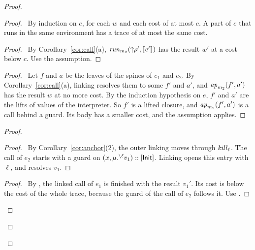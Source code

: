 \begin{proof}
  \begin{proof}
    \pfsketch\ By induction on $e$, for each $w$ and each cost of at most $c$.
    A part of $e$ that runs in the same environment has a trace of at most the same cost.
    \begin{proof}
      \pf\ By Corollary~\ref{cor:call}(a), $\mathit{run}_{m_2}({\uparrow}{\rho'},\llbracket{e'}\rrbracket)$ has the result $w'$ at a cost below $c$.
      Use the assumption.
    \end{proof}
    \begin{proof}
      \pf\ Let $f$ and $a$ be the leaves of the spines of $e_1$ and $e_2$.
      By Corollary~\ref{cor:call}(a), linking resolves them to some $f'$ and $a'$, and $\mathit{ap}_{m_2}(f',a')$ has the result $w$ at no more cost.
      By the induction hypothesis on $e$, $f'$ and $a'$ are the lifts of values of the interpreter.
      So $f'$ is a lifted closure, and $\mathit{ap}_{m_2}(f',a')$ is a call behind a guard.
      Its body has a smaller cost, and the assumption applies.
    \end{proof}
    \begin{proof}
      \begin{proof}
        \pf\ By Corollary~\ref{cor:anchor}(2), the outer linking moves through $\mathit{kill}_{\ell}$.
        The call of $e_2$ starts with a guard on $(x,\muval{\closeloc{\ell}{v_1}})\cons[\InitE]$.
        Linking opens this entry with $\ell$, and resolves $v_1$.
      \end{proof}
      \begin{proof}
        \pf\ By , the linked call of $e_1$ is finished with the result $v_1'$.
        Its cost is below the cost of the whole trace, because the guard of the call of $e_2$ follows it.
        Use .
      \end{proof}

\end{proof}
\end{proof}
\end{proof}
